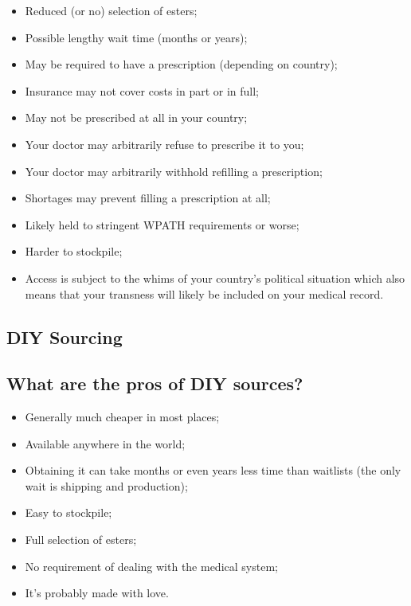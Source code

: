 \documentclass{article}
\begin{document}
\begin{itemize}
  \item Reduced (or no) selection of esters;
  \item Possible lengthy wait time (months or years);
  \item May be required to have a prescription (depending on country);
  \item Insurance may not cover costs in part or in full;
  \item May not be prescribed at all in your country;
  \item Your doctor may arbitrarily refuse to prescribe it to you;
  \item Your doctor may arbitrarily withhold refilling a prescription;
  \item Shortages may prevent filling a prescription at all;
  \item Likely held to stringent WPATH requirements or worse;
  \item Harder to stockpile;
  \item Access is subject to the whims of your country’s political situation which also means that your transness will likely be included on your medical record. 
\end{itemize}

\subsection*{DIY Sourcing}

\subsection{What are the pros of DIY sources?}

\begin{itemize}
\item Generally much cheaper in most places;
\item Available anywhere in the world;
\item Obtaining it can take months or even years less time than waitlists (the only wait is shipping and production);
\item Easy to stockpile;
\item Full selection of esters;
\item No requirement of dealing with the medical system;
\item It’s probably made with love.
\end{itemize}
\end{document}
